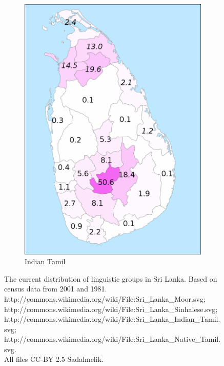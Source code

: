 \documentclass{article}
\begin{document}
\begin{figure}
\begin{center}
\begin{subfigure}[b]{.4\textwidth}{ 
\includegraphics[width=\textwidth]{SriLankaIndianTamil.png}
\caption{Indian Tamil}
}
\end{subfigure}

\end{center}

 \caption{The current distribution of linguistic groups in Sri Lanka. Based on census data from 2001 and 1981.  \\{\tiny
{http://commons.wikimedia.org/wiki/File:Sri\_Lanka\_Moor.svg};    
{http://commons.wikimedia.org/wiki/File:Sri\_Lanka\_Sinhalese.svg};  \\
{http://commons.wikimedia.org/wiki/File:Sri\_Lanka\_Indian\_Tamil.svg};  
{http://commons.wikimedia.org/wiki/File:Sri\_Lanka\_Native\_Tamil.svg}.   \\
All files CC-BY 2.5 Sadalmelik.}
 }
\end{figure}
\end{document}
